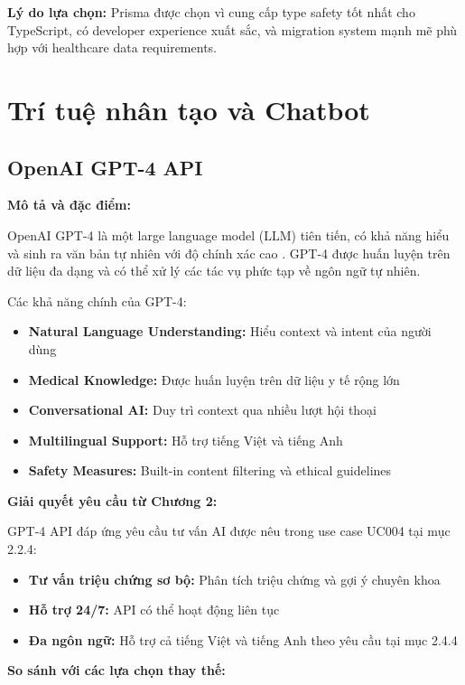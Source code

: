\documentclass[../DoAn.tex]{subfiles}
\begin{document}
\textbf{Lý do lựa chọn:} Prisma được chọn vì cung cấp type safety tốt nhất cho TypeScript, có developer experience xuất sắc, và migration system mạnh mẽ phù hợp với healthcare data requirements.

\section{Trí tuệ nhân tạo và Chatbot}
\label{section:3.4}

\subsection{OpenAI GPT-4 API}
\label{subsection:3.4.1}

\textbf{Mô tả và đặc điểm:}

OpenAI GPT-4 là một large language model (LLM) tiên tiến, có khả năng hiểu và sinh ra văn bản tự nhiên với độ chính xác cao \cite{openai}. GPT-4 được huấn luyện trên dữ liệu đa dạng và có thể xử lý các tác vụ phức tạp về ngôn ngữ tự nhiên.

Các khả năng chính của GPT-4:
\begin{itemize}
    \item \textbf{Natural Language Understanding:} Hiểu context và intent của người dùng
    \item \textbf{Medical Knowledge:} Được huấn luyện trên dữ liệu y tế rộng lớn
    \item \textbf{Conversational AI:} Duy trì context qua nhiều lượt hội thoại
    \item \textbf{Multilingual Support:} Hỗ trợ tiếng Việt và tiếng Anh
    \item \textbf{Safety Measures:} Built-in content filtering và ethical guidelines
\end{itemize}

\textbf{Giải quyết yêu cầu từ Chương 2:}

GPT-4 API đáp ứng yêu cầu tư vấn AI được nêu trong use case UC004 tại mục 2.2.4:
\begin{itemize}
    \item \textbf{Tư vấn triệu chứng sơ bộ:} Phân tích triệu chứng và gợi ý chuyên khoa
    \item \textbf{Hỗ trợ 24/7:} API có thể hoạt động liên tục
    \item \textbf{Đa ngôn ngữ:} Hỗ trợ cả tiếng Việt và tiếng Anh theo yêu cầu tại mục 2.4.4
\end{itemize}

\textbf{So sánh với các lựa chọn thay thế:}
\end{document}
